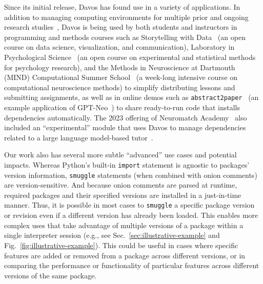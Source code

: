 \documentclass[preprint,12pt,a4paper]{elsarticle}
\begin{document}
Since its initial release, Davos has found use in a variety of applications. In
addition to managing computing environments for multiple prior and ongoing
research studies~\citep{MannEtal23a, OwenMann23, ZimaEtal23}, Davos is being
used by both students and instructors in programming and methods courses such
as Storytelling with Data~\cite{Mann21a} (an open course on data science,
visualization, and communication), Laboratory in Psychological
Science~\cite{Mann22} (an open course on experimental and statistical methods
for psychology research), and the Methods in Neuroscience at Dartmouth (MIND)
Computational Summer School~\cite{MIND23} (a week-long intensive course on
computational neuroscience methods) to simplify distributing lessons
and submitting assignments, as well as in online demos such as
\texttt{abstract2paper}~\cite{Mann21b} (an example application of
GPT-Neo~\cite{GaoEtal20, BlacEtal21}) to share ready-to-run code that installs
dependencies automatically. The 2023 offering of Neuromatch
Academy~\cite{vanVEtal21} also included an ``experimental'' module that uses
Davos to manage dependencies related to a large language model-based
tutor~\cite{MannEtal23b}.

Our work also has several more subtle ``advanced'' use cases and potential
impacts. Whereas Python's built-in \texttt{import} statement is agnostic to
packages' version information, \texttt{smuggle} statements (when combined with
onion comments) are version-sensitive. And because onion comments are parsed at
runtime, required packages and their specified versions are installed in a
just-in-time manner. Thus, it is possible in most cases to \texttt{smuggle} a
specific package version or revision even if a different version has already
been loaded. This enables more complex uses that take advantage of multiple
versions of a package within a single interpreter session (e.g., see
Sec.~\ref{sec:illustrative-example} and Fig.~\ref{fig:illustrative-example}).
This could be useful in cases where specific features are added or removed from
a package across different versions, or in comparing the performance or
functionality of particular features across different versions of the same
package.
\end{document}
